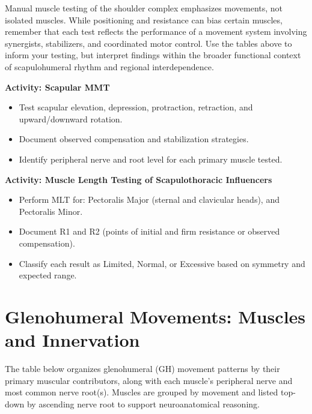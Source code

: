 \begin{tcolorbox}[colback=gray!5, colframe=black, title={Reminder: Movement, Not Muscle Isolation}]
Manual muscle testing of the shoulder complex emphasizes movements, not isolated muscles. While positioning and resistance can bias certain muscles, remember that each test reflects the performance of a movement system involving synergists, stabilizers, and coordinated motor control. Use the tables above to inform your testing, but interpret findings within the broader functional context of scapulohumeral rhythm and regional interdependence.
\end{tcolorbox}

\begin{labactivitybox}
\textbf{Activity: Scapular MMT}
\begin{itemize}
  \item Test scapular elevation, depression, protraction, retraction, and upward/downward rotation.
  \item Document observed compensation and stabilization strategies.
  \item Identify peripheral nerve and root level for each primary muscle tested.
\end{itemize}
\end{labactivitybox}

\begin{labactivitybox}
\textbf{Activity: Muscle Length Testing of Scapulothoracic Influencers}
\begin{itemize}
  \item Perform MLT for: Pectoralis Major (sternal and clavicular heads), and Pectoralis Minor.
  \item Document R1 and R2 (points of initial and firm resistance or observed compensation).
  \item Classify each result as Limited, Normal, or Excessive based on symmetry and expected range.
\end{itemize}
\end{labactivitybox}

\section*{Glenohumeral Movements: Muscles and Innervation}

\vspace{.5cm}

\noindent
The table below organizes glenohumeral (GH) movement patterns by their primary muscular contributors, along with each muscle’s peripheral nerve and most common nerve root(s). Muscles are grouped by movement and listed top-down by ascending nerve root to support neuroanatomical reasoning.

